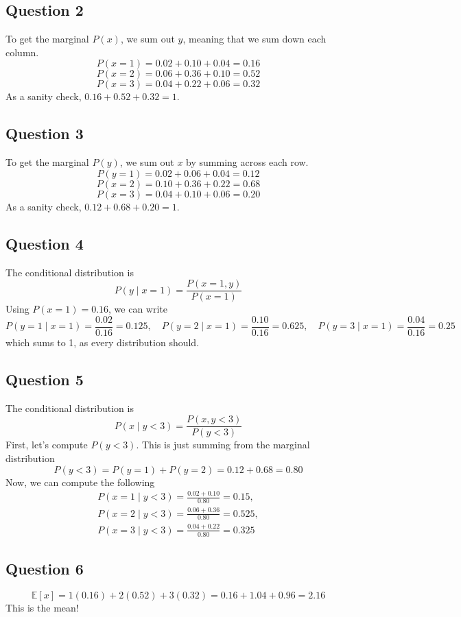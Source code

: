 \documentclass[11pt]{article}
\newcommand{\E}{\mathbb{E}}
\begin{document}
\subsection*{Question 2}
To get the marginal $P(x)$, we sum out $y$, meaning that we sum down each column.
\[
P(x=1)=0.02+0.10+0.04=0.16
\]
\[
P(x=2)=0.06+0.36+0.10=0.52
\]
\[
P(x=3)=0.04+0.22+0.06=0.32
\]
As a sanity check, $0.16+0.52+0.32=1$.

\subsection*{Question 3}
To get the marginal $P(y)$, we sum out $x$ by summing across each row.
\[
P(y=1)=0.02+0.06+0.04=0.12
\]
\[
P(x=2)=0.10+0.36+0.22=0.68
\]
\[
P(x=3)=0.04+0.10+0.06=0.20
\]
As a sanity check, $0.12+0.68+0.20=1$.

\subsection*{Question 4}
The conditional distribution is
\[
P(y\mid x=1)=\frac{P(x=1,y)}{P(x=1)}
\]
Using $P(x=1)=0.16$, we can write
\[
P(y=1\mid x=1)=\frac{0.02}{0.16}=0.125,\quad
P(y=2\mid x=1)=\frac{0.10}{0.16}=0.625,\quad
P(y=3\mid x=1)=\frac{0.04}{0.16}=0.25
\]
which sums to 1, as every distribution should.

\subsection*{Question 5}
The conditional distribution is
\[
P(x\mid y<3)=\frac{P(x,y<3)}{P(y<3)}
\]
First, let's compute $P(y< 3)$. This is just summing from the marginal distribution
\[
P(y< 3) = P(y=1) + P(y=2) = 0.12 + 0.68 = 0.80
\]
Now, we can compute the following 
\begin{gather*}
    P(x=1\mid y<3)=\frac{0.02+0.10}{0.80}=0.15,\\
    P(x=2\mid y<3)=\frac{0.06+0.36}{0.80}=0.525,\\
    P(x=3\mid y<3)=\frac{0.04+0.22}{0.80}=0.325
\end{gather*}

\subsection*{Question 6}
\[
\E[x]=1(0.16)+2(0.52)+3(0.32)=0.16+1.04+0.96=2.16
\]
This is the mean!
\end{document}
